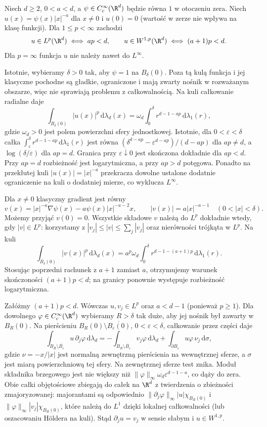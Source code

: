 \begin{przyklad}
\label{ex:pde9-power}
Niech $d\ge2$, $0<a<d$, a $\psi\in C_c^\infty(\R^d)$
będzie równa $1$ w otoczeniu zera. Niech $u(x)=\psi(x)|x|^{-a}$
dla $x\ne0$ i $u(0)=0$ (wartość w zerze nie wpływa
na klasę funkcji). Dla $1\le p<\infty$ zachodzi
\[
 u\in L^p(\R^d)\iff ap<d,\qquad
 u\in W^{1,p}(\R^d)\iff (a+1)p<d.
\]
Dla $p=\infty$ funkcja $u$ nie należy nawet do $L^\infty$.

Istotnie, wybieramy $\delta>0$ tak, aby $\psi=1$ na
$B_\delta(0)$. Poza tą kulą funkcja i jej klasyczne pochodne
są gładkie, ograniczone i mają zwarty nośnik w rozważanym
obszarze, więc nie sprawiają problemu z całkowalnością.
Na kuli całkowanie radialne daje
\[
 \int_{B_\delta(0)} |u(x)|^p\,\mathrm d\lambda_d(x)
 =\omega_d\int_0^\delta r^{d-1-ap}\,\mathrm d\lambda_1(r),
\]
gdzie $\omega_d>0$ jest polem powierzchni sfery jednostkowej.
Istotnie, dla $0<\varepsilon<\delta$ całka
$\int_\varepsilon^\delta r^{d-1-ap}\,\mathrm d\lambda_1(r)$
jest równa $(\delta^{d-ap}-\varepsilon^{d-ap})/(d-ap)$
dla $ap\ne d$, a $\log(\delta/\varepsilon)$ dla $ap=d$.
Granica przy $\varepsilon\downarrow0$ jest skończona
dokładnie dla $ap<d$. Przy $ap=d$ rozbieżność jest
logarytmiczna, a przy $ap>d$ potęgowa. Ponadto na przekłutej kuli
$|u(x)|=|x|^{-a}$ przekracza dowolne ustalone dodatnie
ograniczenie na kuli o dodatniej mierze, co wyklucza $L^\infty$.

Dla $x\ne0$ klasyczny gradient jest równy
\[
 v(x)=|x|^{-a}\nabla\psi(x)-a\psi(x)|x|^{-a-2}x,
 \qquad |v(x)|=a|x|^{-a-1}\quad(0<|x|<\delta).
\]
Możemy przyjąć $v(0)=0$. Wszystkie składowe $v$ należą
do $L^p$ dokładnie wtedy, gdy $|v|\in L^p$:
korzystamy z $|v_j|\le |v|\le\sum_j|v_j|$ oraz
nierówności trójkąta w $L^p$. Na kuli
\[
 \int_{B_\delta(0)} |v(x)|^p\,\mathrm d\lambda_d(x)
 =a^p\omega_d\int_0^\delta r^{d-1-(a+1)p}\,
 \mathrm d\lambda_1(r).
\]
Stosując poprzedni rachunek z $a+1$ zamiast $a$,
otrzymujemy warunek skończoności $(a+1)p<d$;
na granicy ponownie występuje rozbieżność logarytmiczna.

Załóżmy $(a+1)p<d$. Wówczas $u,v_j\in L^p$ oraz
$a<d-1$ (ponieważ $p\ge1$). Dla dowolnego
$\varphi\in C_c^\infty(\R^d)$ wybieramy $R>\delta$
tak duże, aby jej nośnik był zawarty w $B_R(0)$.
Na pierścieniu $B_R(0)\setminus\overline{B_\varepsilon(0)}$,
$0<\varepsilon<\delta$, całkowanie przez części daje
\[
 \int_{B_R\setminus\overline{B_\varepsilon}}
 u\,\partial_j\varphi\,\mathrm d\lambda_d
 =-\int_{B_R\setminus\overline{B_\varepsilon}}
 v_j\varphi\,\mathrm d\lambda_d
 +\int_{\partial B_\varepsilon}
 u\varphi\,\nu_j\,\mathrm d\sigma,
\]
gdzie $\nu=-x/|x|$ jest normalną zewnętrzną pierścienia
na wewnętrznej sferze, a $\sigma$ jest miarą powierzchniową
tej sfery. Na zewnętrznej sferze test znika.
Moduł składnika brzegowego jest nie większy niż
$\|\varphi\|_\infty\omega_d\varepsilon^{d-1-a}$,
co dąży do zera. Obie całki objętościowe zbiegają do
całek na $\R^d$ z twierdzenia o zbieżności zmajoryzowanej:
majorantami są odpowiednio
$\|\partial_j\varphi\|_\infty |u|\chi_{B_R(0)}$
i $\|\varphi\|_\infty |v_j|\chi_{B_R(0)}$,
które należą do $L^1$ dzięki lokalnej całkowalności
(lub oszacowaniu Höldera na kuli).
Stąd $\partial_j u=v_j$ w sensie słabym i $u\in W^{1,p}$.


\end{przyklad}
